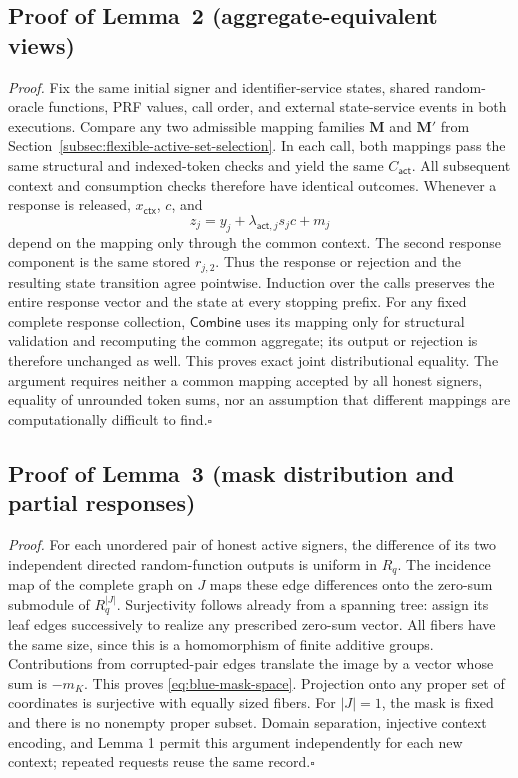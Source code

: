 \documentclass[lettersize,journal]{IEEEtran}
\begin{document}
	\subsection{Proof of Lemma~2 (aggregate-equivalent views)}
	\label{app:talon-lemma2-proof}
	
	{
		\emph{Proof.}
		Fix the same initial signer and identifier-service states, shared
		random-oracle functions, PRF values, call order, and external state-service
		events in both executions. Compare any two admissible mapping families
		$\mathbf M$ and $\mathbf M'$ from
		Section~\ref{subsec:flexible-active-set-selection}. In each call, both
		mappings pass the same structural and indexed-token checks and yield the
		same $C_{\mathsf{act}}$. All subsequent context and consumption checks
		therefore have identical outcomes. Whenever a response is released,
		$x_{\mathsf{ctx}}$, $c$, and
		\[
		z_j=y_j+\lambda_{\mathsf{act},j}s_jc+m_j
		\]
		depend on the mapping only through the common context. The second response
		component is the same stored $r_{j,2}$. Thus the response or rejection and
		the resulting state transition agree pointwise. Induction over the calls
		preserves the entire response vector and the state at every stopping prefix.
		For any fixed complete response collection, $\mathsf{Combine}$ uses its
		mapping only for structural validation and recomputing the common aggregate;
		its output or rejection is therefore unchanged as well. This proves exact
		joint distributional equality. The argument requires neither a common
		mapping accepted by all honest signers, equality of unrounded token sums,
		nor an assumption that different mappings are computationally difficult
		to find.\hfill$\square$
	}
	
	\subsection{Proof of Lemma~3 (mask distribution and partial responses)}
	\label{app:talon-lemma3-proof}
	
	\emph{Proof.}
	For each unordered pair of honest active signers, the difference of its two
	independent directed random-function outputs is uniform in $R_q$. The
	incidence map of the complete graph on $J$ maps these edge differences onto
	the zero-sum submodule of $R_q^{|J|}$. Surjectivity follows already from a
	spanning tree: assign its leaf edges successively to realize any prescribed
	zero-sum vector. All fibers have the same size, since this is a homomorphism
	of finite additive groups. Contributions from corrupted-pair edges translate
	the image by a vector whose sum is $-m_K$. This proves
	\eqref{eq:blue-mask-space}. Projection onto any proper set of coordinates
	is surjective with equally sized fibers. For $|J|=1$, the mask is fixed and
	there is no nonempty proper subset. Domain separation, injective context
	encoding, and Lemma 1 permit this argument independently for each new
	context; repeated requests reuse the same record.\hfill$\square$
	
\end{document}
